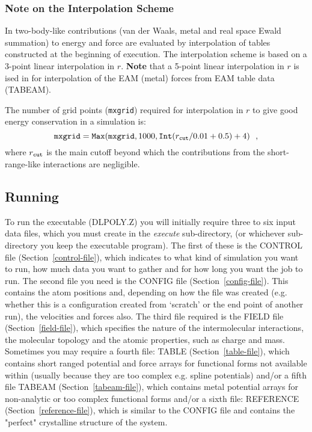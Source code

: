 \subsubsection{Note on the Interpolation Scheme}
\label{interpolation}

In \D two-body-like contributions (van der Waals,
metal and real space Ewald summation)
to energy and force are evaluated by interpolation of tables
constructed at the beginning of execution.  The \D interpolation
scheme is based on a 3-point linear interpolation in $r$.  {\bf Note}
that a 5-point linear interpolation in $r$ is ised in \D for
interpolation of the EAM (metal) forces from EAM table data (TABEAM).

The number of grid points ({\tt mxgrid}) required for
interpolation in $r$ to give good energy conservation in a
simulation is:
\[ {\tt mxgrid} = {\tt Max}({\tt mxgrid}, 1000, {\tt Int}(r_{\tt cut}/0.01 + 0.5) + 4)~~, \]
where $r_{\tt cut}$ is the main cutoff beyond which the
contributions from the short-range-like interactions are negligible.

\subsection{Running}

To run the \D executable (DLPOLY.Z) you will initially require
three to six input data files, which you must
create in the {\em execute} sub-directory, (or whichever
sub-directory you keep the executable program).  The first of
these is the CONTROL file (Section~\ref{control-file}), which
indicates to \D what kind of simulation you want to run, how
much data you want to gather and for how long you want the job
to run.  The second file you need is the CONFIG file
(Section~\ref{config-file}).  This contains the atom
positions and, depending on how the file was created (e.g. whether
this is a configuration created from `scratch' or the end point of
another run), the velocities and forces also.  The third file
required is the FIELD file (Section~\ref{field-file}), which
specifies the nature of the intermolecular interactions, the
molecular topology and the atomic properties, such as charge and
mass.  Sometimes you may require a fourth file: TABLE (Section~\ref{table-file}),
which contains short ranged potential and force
arrays for functional forms not available within \D (usually because
they are too complex e.g. spline potentials) and/or a fifth file
TABEAM (Section~\ref{tabeam-file}), which contains metal potential
arrays for non-analytic or too complex functional forms and/or a
sixth file: REFERENCE (Section~\ref{reference-file}), which is
similar to the CONFIG file and contains the "perfect" crystalline
structure of the system.

